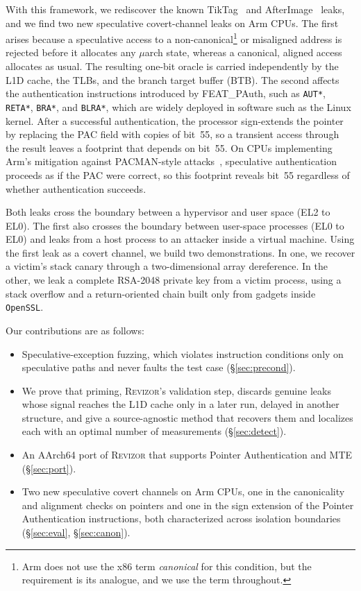 \documentclass[letterpaper,twocolumn,10pt]{article}
\makeatletter
\theoremstyle{definition}
\def\uarch@bold#1#2\@nil{\if b#1\boldmath\fi}
\DeclareRobustCommand{\uarch}{{\expandafter\uarch@bold\f@series\@nil\ensuremath{\mu}}arch\xspace}
\makeatother
\begin{document}
With this framework, we rediscover the known TikTag~\cite{tiktag} and
AfterImage~\cite{afterimage} leaks, and we find two new speculative covert-channel leaks on Arm CPUs. The first
arises because a speculative access to a non-canonical\footnote{Arm does not use the x86 term \emph{canonical} for this condition, but the requirement is its analogue, and we use the term throughout.} or misaligned address is
rejected before it allocates any \uarch state, whereas a canonical,
aligned access allocates as usual. The resulting one-bit oracle is carried independently
by the L1D cache, the TLBs, and the branch target buffer (BTB). The second
affects the authentication instructions introduced by FEAT\_PAuth, such as
\texttt{AUT*}, \texttt{RETA*}, \texttt{BRA*}, and \texttt{BLRA*}, which
are widely deployed in software such as the Linux kernel. After a successful
authentication, the processor sign-extends the pointer by replacing the PAC field
with copies of bit~55, so a transient access through the result leaves a footprint
that depends on bit~55. On CPUs implementing Arm's mitigation against PACMAN-style attacks~\cite{arm_pacman, arm_fpacc_spec}, speculative
authentication proceeds as if the PAC were correct, so this footprint reveals bit~55
regardless of whether authentication succeeds.

Both leaks cross the boundary between a hypervisor and user space (EL2 to EL0). The
first also crosses the boundary between user-space processes (EL0 to EL0) and leaks
from a host process to an attacker inside a virtual machine. Using the first leak as a
covert channel, we build two demonstrations. In one, we recover a victim's stack canary
through a two-dimensional array dereference. In the other, we leak a complete RSA-2048
private key from a victim process, using a stack overflow and a return-oriented chain
built only from gadgets inside \texttt{OpenSSL}.

\noindent Our contributions are as follows:
\begin{itemize}
  \item Speculative-exception fuzzing, which violates instruction conditions only on
        speculative paths and never faults the test case (\S\ref{sec:precond}).
  \item We prove that priming, \textsc{Revizor}'s validation step, discards genuine leaks
        whose signal reaches the L1D cache only in a later run, delayed in another structure,
        and give a source-agnostic method that recovers them and localizes each with an
        optimal number of measurements (\S\ref{sec:detect}).
  \item An AArch64 port of \textsc{Revizor} that supports Pointer Authentication
        and MTE (\S\ref{sec:port}).
  \item Two new speculative covert channels on Arm CPUs, one in the canonicality and alignment
        checks on pointers and one in the sign extension of the Pointer Authentication
        instructions, both characterized across isolation boundaries (\S\ref{sec:eval}, \S\ref{sec:canon}).
\end{itemize}
\end{document}
